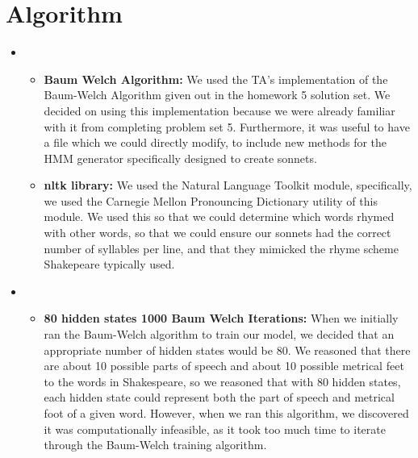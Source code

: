 \section{Algorithm}
\medskip
\begin{itemize}





    \item {}
    \begin{itemize}
    \item \textbf{Baum Welch Algorithm:} We used the TA's implementation of the Baum-Welch Algorithm given out in the homework 5 solution set. We decided on using this implementation because we were already familiar with it from completing problem set 5. Furthermore, it was useful to have a file which we could directly modify, to include new methods for the HMM generator specifically designed to create sonnets.

    \item \textbf{nltk library:} We used the Natural Language Toolkit module, specifically, we used the Carnegie Mellon Pronouncing Dictionary utility of this module. We used this so that we could determine which words rhymed with other words, so that we could ensure our sonnets had the correct number of syllables per line, and that they mimicked the rhyme scheme Shakepeare typically used.
    \end{itemize}

    \item {}
    \begin{itemize}
    \item \textbf{80 hidden states 1000 Baum Welch Iterations:} When we initially ran the Baum-Welch algorithm to train our model, we decided that an appropriate number of hidden states would be 80. We reasoned that there are about 10 possible parts of speech and about 10 possible metrical feet to the words in Shakespeare, so we reasoned that with 80 hidden states, each hidden state could represent both the part of speech and metrical foot of a given word. However, when we ran this algorithm, we discovered it was computationally infeasible, as it took too much time to iterate through the Baum-Welch training algorithm.


\end{itemize}
\end{itemize}

